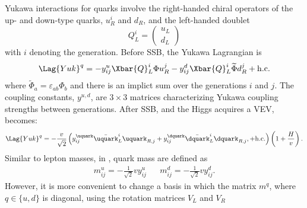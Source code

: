 Yukawa interactions for quarks involve the right-handed chiral operators of the up- and down-type
quarks, $u_R^i$ and $d_R$, and the left-handed doublet
\begin{equation}
  Q_L^i = \begin{pmatrix}u_L\\d_L\end{pmatrix}
\end{equation}
with $i$ denoting the generation.
Before SSB, the Yukawa Lagrangian is
\begin{equation}
  \Lag{Yuk}^q = - y_{ij}^u\Xbar{Q}_L^i\Phi u_R^j
  - y_{ij}^d\Xbar{Q}_L^i\widetilde\Phi d_R^j + \mathrm{h.c.}
  \label{eq:th:lagyukq}
\end{equation}
where $\widetilde\Phi_a = \varepsilon_{ab}\Phi_b$ and there is an implict sum over the generations
$i$ and $j$.
The coupling constants, $y^{u,d}$, are $3\times3$ matrices characterizing Yukawa coupling strengths
between generations.
After SSB, and the Higgs acquires a VEV,  becomes:
\begin{equation}
  \Lag{Yuk}^q =
  - \frac{v}{\sqrt{2}}
  \left(
  y_{ij}^\uquark\bar\uquark_L^i\uquark_{R,j}
  + y_{ij}^\dquark\bar\dquark_L^i\dquark_{R,j},
  + \mathrm{h.c.}
  \right)
  \left(1 + \frac{H}{v}\right).
  \label{eq:th:lagyuk2}
\end{equation}
Similar to lepton masses, in , quark mass are defined as
\begin{align}
  m_{ij}^u = -\frac{1}{\sqrt{2}}vy_{ij}^u &&
  m_{ij}^d = -\frac{1}{\sqrt{2}}vy_{ij}^d.
\end{align}
However, it is more convenient to change a basis in which the matrix $m^q$, where $q\in\{u,d\}$ is
diagonal, using the rotation matrices $V_L$ and $V_R$
